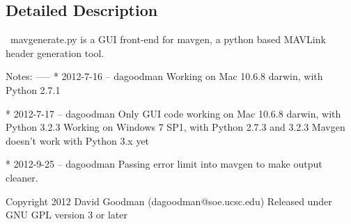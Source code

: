 \subsection{Detailed Description}
\begin{DoxyVerb}\
mavgenerate.py is a GUI front-end for mavgen, a python based MAVLink
header generation tool.

Notes:
-----
* 2012-7-16 -- dagoodman
Working on Mac 10.6.8 darwin, with Python 2.7.1

* 2012-7-17 -- dagoodman
Only GUI code working on Mac 10.6.8 darwin, with Python 3.2.3
Working on Windows 7 SP1, with Python 2.7.3 and 3.2.3
Mavgen doesn't work with Python 3.x yet

* 2012-9-25 -- dagoodman
Passing error limit into mavgen to make output cleaner.

Copyright 2012 David Goodman (dagoodman@soe.ucsc.edu)
Released under GNU GPL version 3 or later\end{DoxyVerb}
 